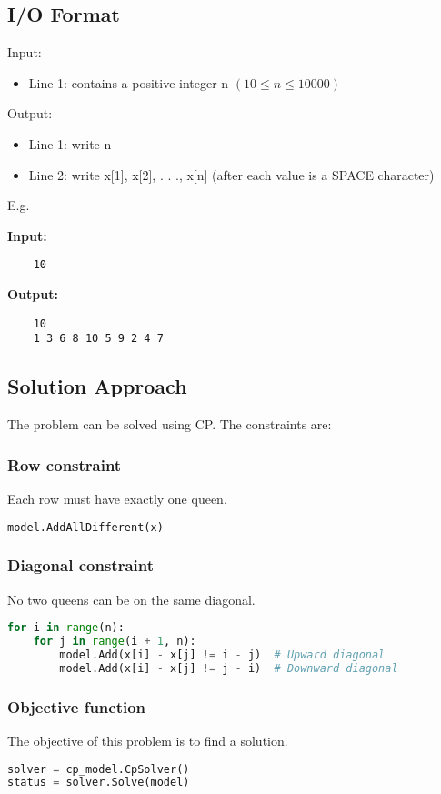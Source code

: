 \documentclass{article}
\begin{document}
\subsection{I/O Format}
Input:
\begin{itemize}
    \item Line 1: contains a positive integer n $(10 \le n \le 10000)$
\end{itemize}
Output:
\begin{itemize}
    \item Line 1: write n 
    \item Line 2: write x[1], x[2],  . . ., x[n] (after each value is a SPACE character)
\end{itemize}
E.g.

\begin{multicols}{2}
\textbf{Input:}
\begin{verbatim}
    10
\end{verbatim}
\textbf{Output:}
\begin{verbatim}
    10
    1 3 6 8 10 5 9 2 4 7
\end{verbatim}
\end{multicols}

\subsection{Solution Approach}
The problem can be solved using CP. The constraints are:
\subsubsection{Row constraint}
Each row must have exactly one queen.
\begin{lstlisting}[language=Python]
model.AddAllDifferent(x)
\end{lstlisting}

\subsubsection{Diagonal constraint}
No two queens can be on the same diagonal.
\begin{lstlisting}[language=Python]
for i in range(n):
    for j in range(i + 1, n):
        model.Add(x[i] - x[j] != i - j)  # Upward diagonal
        model.Add(x[i] - x[j] != j - i)  # Downward diagonal
\end{lstlisting}

\subsubsection{Objective function}
The objective of this problem is to find a solution.
\begin{lstlisting}[language=Python]
solver = cp_model.CpSolver()
status = solver.Solve(model)
\end{lstlisting}
\end{document}
